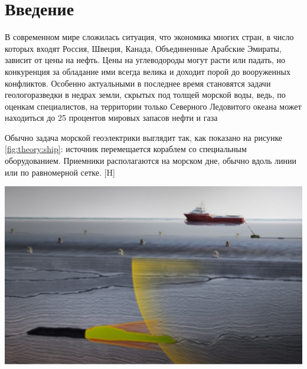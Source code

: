 \documentclass[a4paper,14pt]{article}
\makeatletter
\renewenvironment{figure}[1][\fps@figure]{
  \edef\@tempa{\noexpand\@float{figure}[#1]}
  \@tempa
  \addtocounter{foofigure}{1}
}{
  \end@float
}
\makeatother
\begin{document}

\tableofcontents


\clearpage
{}
\section*{Введение}


В современном мире сложилась ситуация, что экономика многих стран, в число которых входят Россия, Швеция, Канада, Объединенные Арабские Эмираты, зависит от цены на нефть. Цены на углеводороды могут расти или падать, но конкуренция за обладание ими всегда велика и доходит порой до вооруженных конфликтов. Особенно актуальными в последнее время становятся задачи геологоразведки в недрах земли, скрытых под толщей морской воды, ведь, по оценкам специалистов, на территории только Северного Ледовитого океана может находиться до 25 процентов мировых запасов нефти и газа~\citep{shurina}

Обычно задача морской геоэлектрики выглядит так, как показано на рисунке \ref{fig:theory:ship}: источник перемещается кораблем со специальным оборудованием. Приемники располагаются на морском дне, обычно вдоль линии или по равномерной сетке.
\begin{figure}[H]
	\centering
	\includegraphics[scale=0.25]{theory/10000000000004B4000002D101BC1A4D.png}
	\caption{задача морской геоэлектрики}
	\label{fig:theory:ship}
\end{figure}
\end{document}
